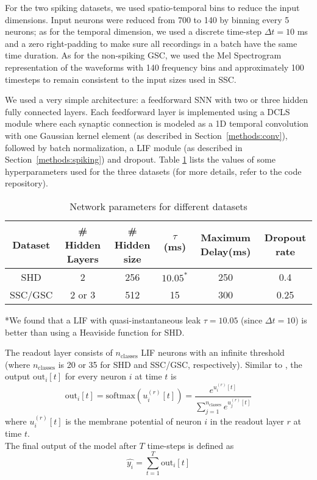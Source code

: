 \documentclass{article} \usepackage{iclr2024_conference,times}
\begin{document}
For the two spiking datasets, we used spatio-temporal bins to reduce the input dimensions. 
Input neurons were reduced from 700 to 140 by binning every 5 neurons; as for the temporal dimension, we used a discrete time-step $\Delta t = 10$ ms and a zero right-padding to make sure all recordings in a batch have the same time duration. As for the non-spiking GSC, we used the Mel Spectrogram representation of the waveforms with 140 frequency bins and approximately 100 timesteps to remain consistent to the input sizes used in SSC.



We used a very simple architecture: a feedforward SNN with two or three hidden fully connected layers. Each feedforward layer is implemented using a DCLS module where each synaptic connection is modeled as a 1D temporal convolution with one Gaussian kernel element (as described in Section~\ref{methods:conv}), followed by batch normalization, a LIF module (as described in Section~\ref{methods:spiking}) and dropout. Table \ref{NetworkParams} lists the values of some hyperparameters used for the three datasets (for more details, refer to the code repository). 

\begin{table}[ht]
    \caption{Network parameters for different datasets}
    \label{NetworkParams}
    \centering
    \begin{tabular}{cccccc}
        \toprule
            Dataset  & \# Hidden Layers & \# Hidden size & $\tau$(ms) &Maximum Delay(ms) & Dropout rate  \\
        \midrule
            SHD & 2 & 256 & $10.05^*$   & 250 & 0.4\\
            SSC/GSC & 2 or 3 & 512 & 15 & 300 & 0.25\\
        \bottomrule
  \end{tabular}
{\raggedright\footnotesize
*We found that a LIF with quasi-instantaneous leak $\tau=10.05$ (since  $\Delta t = 10$) is better than using a Heaviside function for SHD. \par}
  \vspace{1ex}
\end{table}
   

The readout layer consists of $n_{\text{classes}}$ LIF neurons with an infinite threshold (where $n_{\text{classes}}$ is 20 or 35 for SHD and SSC/GSC, respectively). Similar to \citet{baseline}, the output $\text{out}_i[t]$ for every neuron $i$ at time $t$ is
\begin{equation}
    \text{out}_i[t] = \text{softmax}(u_i^{(r)}[t]) = \frac{e^{u_i^{(r)}[t]}}{\sum_{j=1}^{n_{\text{classes}}} e^{u_j^{(r)}[t]}}
\end{equation}
where $u_i^{(r)}[t]$ is the membrane potential of neuron $i$ in the readout layer $r$ at time $t$.\\
The final output of the model after $T$ time-steps is defined as
\begin{equation}
\hat{y_i} = \sum_{t=1}^{T} \text{out}_i[t]
\end{equation}
\end{document}
